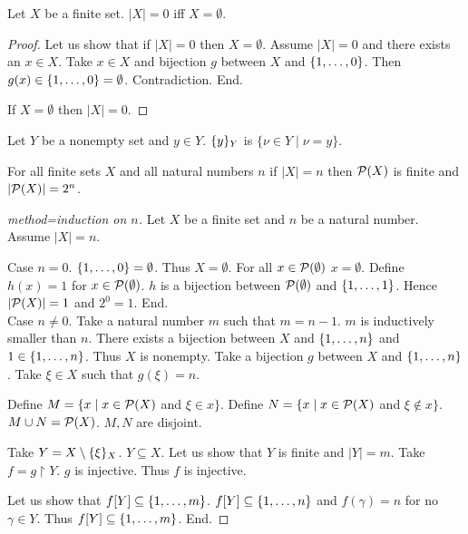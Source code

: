 \documentclass{article}
\begin{document}
  \begin{forthel}

  \begin{lemma}
  Let $X$ be a finite set.
  $|X| = 0$ iff $X = \emptyset$.
  \end{lemma}
  \begin{proof}
  Let us show that if $|X| = 0$ then $X = \emptyset$.
    Assume $|X| = 0$ and there exists an $x \in X$.
    Take $x \in X$ and bijection $g$ between $X$ and $\{1,\dots,0\}$. Then $g(x) \in \{1,\dots,0\} = \emptyset$. Contradiction. End.

  If $X = \emptyset$ then $|X| = 0$.
  \end{proof}


  \begin{definition}
  Let $Y$ be a nonempty set and $y \in Y$.
  $\{y\}_{Y}$ is $\{\nu \in Y \mid \nu=y \}$.
  \end{definition}

  \begin{theorem}
  For all finite sets $X$ and all natural numbers $n$ if $|X| = n$ then
  ${\cal P}(X)$ is finite and $|{\cal P}(X)| = 2^{n}$.
  \end{theorem}
  \begin{proof}[method=induction on $n$]
  Let $X$ be a finite set and $n$ be a natural number. Assume $|X| = n$.

  Case $n = 0$. $\{1,\dots,0\} = \emptyset$. Thus $X = \emptyset$.
    For all $x \in {\cal P}(\emptyset)$ $x = \emptyset$.
    Define $h(x) = 1$ for $x \in {\cal P}(\emptyset)$.
    $h$ is a bijection between ${\cal P}(\emptyset)$ and $\{1,\dots,1\}$.
    Hence $|{\cal P}(X)| = 1$ and $2^{0} = 1$. End.\\

  Case $n \neq 0$. Take a natural number $m$ such that $m = n - 1$. $m$ is inductively smaller than $n$.
    There exists a bijection between $X$ and $\{1,\dots,n\}$ and $1 \in \{1,\dots,n\}$. Thus $X$ is nonempty.
    Take a bijection $g$ between $X$ and $\{1,\dots,n\}$. Take $\xi \in X$ such that $g(\xi) = n$.

    Define $M = \{x \mid x \in {\cal P}(X)$ and $\xi \in x\}$. Define $N = \{x \mid x \in {\cal P}(X)$ and $\xi \notin x\}$.
    $M \cup N = {\cal P}(X)$. $M,N$ are disjoint.

    Take $Y = X \setminus \{\xi\}_{X}$. $Y \subseteq X$.
    Let us show that $Y$ is finite and $|Y| = m$.
      Take $f = g \upharpoonright Y$.
      $g$ is injective. Thus $f$ is injective.

      Let us show that $f[Y] \subseteq \{1,\dots,m\}$.
        $f[Y] \subseteq \{1,\dots,n\}$ and $f(\gamma) = n$ for no $\gamma \in Y$.
        Thus $f[Y] \subseteq \{1,\dots,m\}$. End.


\end{proof}
\end{forthel}
\end{document}
